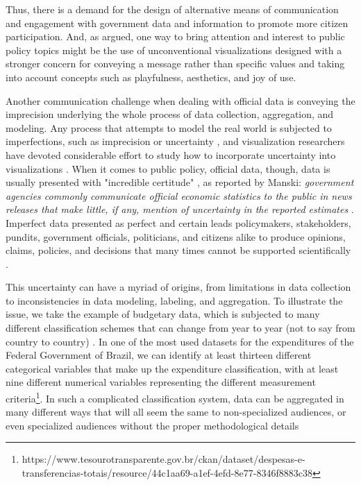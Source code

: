 \documentclass[manuscript, screen]{timtm}
\begin{document}
Thus, there is a demand for the design of alternative means of communication and engagement with government data and information to promote more citizen participation. And, as argued, one way to bring attention and interest to public policy topics might be the use of unconventional visualizations designed with a stronger concern for conveying a message rather than specific values and taking into account concepts such as playfulness, aesthetics, and joy of use.

Another communication challenge when dealing with official data is conveying the imprecision underlying the whole process of data collection, aggregation, and modeling. Any process that attempts to model the real world is subjected to imperfections, such as imprecision or uncertainty \cite{ph1997imperfect}, and visualization researchers have devoted considerable effort to study how to incorporate uncertainty into visualizations \cite{HullmanJessica2019IPoE, Padilla-uncertainty-chapter, BoukhelifaNadia2012ESLf-sketchy}. When it comes to public policy, official data, though, data is usually presented with "incredible certitude" \cite{incredible-certitude-manski-2019}, as reported by Manski: \textit{government agencies commonly communicate official economic statistics to the public in news releases that make little, if any, mention of uncertainty in the reported estimates} \cite{uncertainty=official-statistics-manski-2015}. Imperfect data presented as perfect and certain leads policymakers, stakeholders, pundits, government officials, politicians, and citizens alike to produce opinions, claims, policies, and decisions that many times cannot be supported scientifically \cite{morgenstern1963accuracy}.

This uncertainty can have a myriad of origins, from limitations in data collection to inconsistencies in data modeling, labeling, and aggregation. To illustrate the issue, we take the example of budgetary data, which is subjected to many different classification schemes that can change from year to year (not to say from country to country) \cite{imf-budget-classification}. In one of the most used datasets for the expenditures of the Federal Government of Brazil, we can identify at least thirteen different categorical variables that make up the expenditure classification, with at least nine different numerical variables representing the different measurement criteria\footnote{https://www.tesourotransparente.gov.br/ckan/dataset/despesas-e-transferencias-totais/resource/44c1aa69-a1ef-4efd-8e77-8346f8883c38}. In such a complicated classification system, data can be aggregated in many different ways that will all seem the same to non-specialized audiences, or even specialized audiences without the proper methodological details
\end{document}
